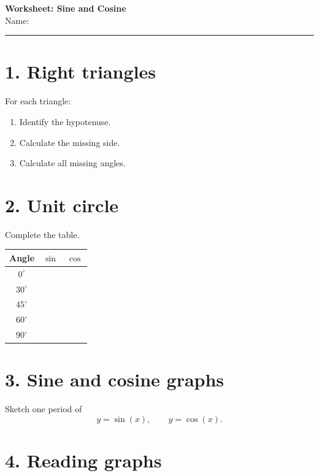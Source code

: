 \documentclass[a4paper,11pt]{article}
\begin{document}
\begin{center}
{\LARGE \textbf{Worksheet: Sine and Cosine}}\\[0.5em]
Name:\rule{5cm}{0.4pt}
\end{center}

\section*{1. Right triangles}
For each triangle:
\begin{enumerate}[label=\alph*)]
\item Identify the hypotenuse.
\item Calculate the missing side.
\item Calculate all missing angles.
\end{enumerate}

\vspace{1cm}

\begin{center}
\end{center}

\section*{2. Unit circle}
Complete the table.

\begin{center}
\begin{tabular}{c|c|c}
Angle & $\sin$ & $\cos$\\
\hline
$0^\circ$ &&\\
$30^\circ$ &&\\
$45^\circ$ &&\\
$60^\circ$ &&\\
$90^\circ$ &&
\end{tabular}
\end{center}

\section*{3. Sine and cosine graphs}

Sketch one period of
\[
y=\sin(x),\qquad y=\cos(x).
\]

\vspace{6cm}

\section*{4. Reading graphs}
\end{document}
